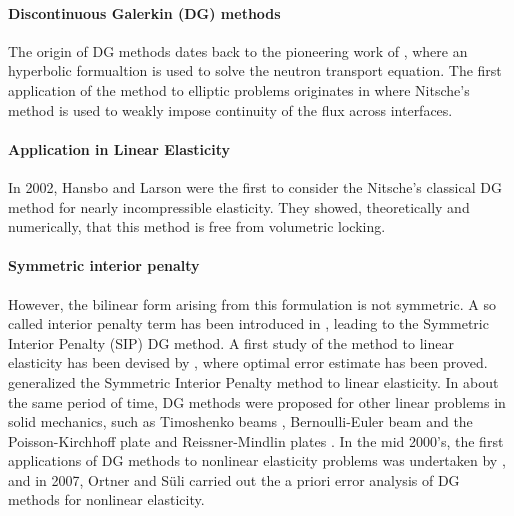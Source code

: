 \paragraph{Discontinuous Galerkin (DG) methods}

The origin of DG methods dates back to the pioneering work of
\cite{reed_triangular_1973}, where an hyperbolic formualtion is used to
solve the neutron transport equation. The first application of the
method to elliptic problems originates in \cite{babuska_finite_1973}
where Nitsche's method \cite{nitsche_uber_1970} is used to weakly impose
continuity of the flux across interfaces.

\paragraph{Application in Linear Elasticity}

In 2002, Hansbo and Larson \cite{hansbo_discontinuous_2002-1} were the first to
consider the Nitsche's classical DG method for nearly incompressible
elasticity. They showed, theoretically and numerically, that this
method is free from volumetric locking.
%
%

\paragraph{Symmetric interior penalty}

However, the bilinear form
arising from this formulation is not symmetric. A so called interior
penalty term has been introduced in \cite{wheeler_elliptic_1978},
leading to the Symmetric Interior Penalty (SIP) DG method. A first study
of the method to linear elasticity has been devised by
\cite{riviere_optimal_2000}, where optimal error estimate has been
proved.
%
%
%
\cite{lew_optimal_2004} generalized the
Symmetric Interior Penalty method to linear elasticity.
In about the same
period of time, DG methods were proposed for other linear problems in
solid mechanics, such as Timoshenko beams
\cite{celiker_locking-free_2006}, Bernoulli-Euler beam and the
Poisson-Kirchhoff plate \cite{brenner_balancing_1999,
  engel_continuousdiscontinuous_2002} and Reissner-Mindlin plates
\cite{arnold_family_2005}. In the mid 2000's, the first applications
of DG methods to nonlinear elasticity problems was undertaken by
\cite{ten_eyck_discontinuous_2006, noels_general_2006}, and in 2007,
Ortner and Süli \cite{ortner_discontinuous_2007} carried out the a
priori error analysis of DG methods for nonlinear elasticity.


